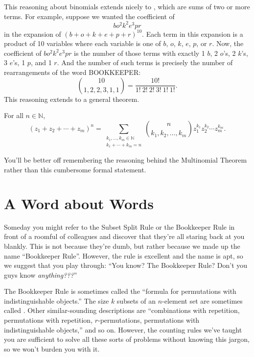 This reasoning about binomials extends nicely to ,
which are sums of two or more terms.  For example, suppose we wanted
the coefficient of
%
\[
b o^2 k^2 e^3 p r
\]
%
in the expansion of $(b + o + k + e + p + r)^{10}$.  Each term in this
expansion is a product of 10 variables where each variable is one of
$b$, $o$, $k$, $e$, $p$, or $r$.  Now, the coefficient of $b o^2 k^2
e^3 p r$ is the number of those terms with exactly 1 $b$, 2 $o$'s, 2
$k$'s, 3 $e$'s, 1 $p$, and 1 $r$.  And the number of such terms is
precisely the number of rearrangements of the word BOOKKEEPER:
\[
\binom{10}{1,2,2,3,1,1} = \frac{10!}{1!\ 2!\ 2!\ 3!\ 1!\ 1!}.
\]
This reasoning extends to a general theorem.

\begin{theorem}\label{multinom-thm}
For all $n \in \mathbb{N}$,
\[
(z_1 + z_2 + \cdots + z_m)^n =
   \sum_{\substack{k_1, \dots, k_m \in \mathbb{N} \\
                   k_1 + \cdots + k_m = n}}
   \binom{n}{k_1, k_2, \dots, k_m} z_1^{k_1} z_2^{k_2} \cdots z_m^{k_m}.
\]
\end{theorem}
You'll be better off remembering the reasoning behind the Multinomial
Theorem rather than this cumbersome formal statement.

\begin{problems}

\practiceproblems
{}

\classproblems
{}

\homeworkproblems
{}

\end{problems}

\section{A Word about Words}

Someday you might refer to the Subset Split Rule or the Bookkeeper Rule
in front of a roomful of colleagues and discover that they're all staring
back at you blankly.  This is not because they're dumb, but rather because
we made up the name ``Bookkeeper Rule''.  However, the rule is excellent
and the name is apt, so we suggest that you play through: ``You know?  The
Bookkeeper Rule?  Don't you guys know \emph{anything???}''

The Bookkeeper Rule is sometimes called the ``formula for permutations
with indistinguishable objects.''  The size $k$ subsets of an $n$-element
set are sometimes called .  Other similar-sounding
descriptions are ``combinations with repetition, permutations with
repetition, $r$-permutations, permutations with indistinguishable
objects,'' and so on.  However, the counting rules we've taught you are
sufficient to solve all these sorts of problems without knowing this
jargon, so we won't burden you with it.

